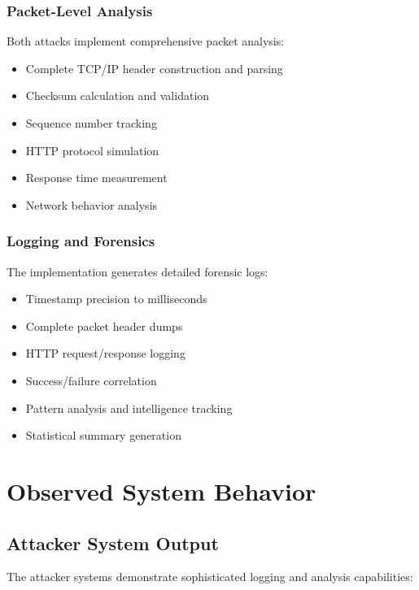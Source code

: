 \documentclass[12pt,a4paper]{article}
\begin{document}
\subsubsection{Packet-Level Analysis}

Both attacks implement comprehensive packet analysis:

\begin{itemize}
    \item Complete TCP/IP header construction and parsing
    \item Checksum calculation and validation
    \item Sequence number tracking
    \item HTTP protocol simulation
    \item Response time measurement
    \item Network behavior analysis
\end{itemize}

\subsubsection{Logging and Forensics}

The implementation generates detailed forensic logs:

\begin{itemize}
    \item Timestamp precision to milliseconds
    \item Complete packet header dumps
    \item HTTP request/response logging
    \item Success/failure correlation
    \item Pattern analysis and intelligence tracking
    \item Statistical summary generation
\end{itemize}

\section{Observed System Behavior}

\subsection{Attacker System Output}

The attacker systems demonstrate sophisticated logging and analysis capabilities:
\end{document}
